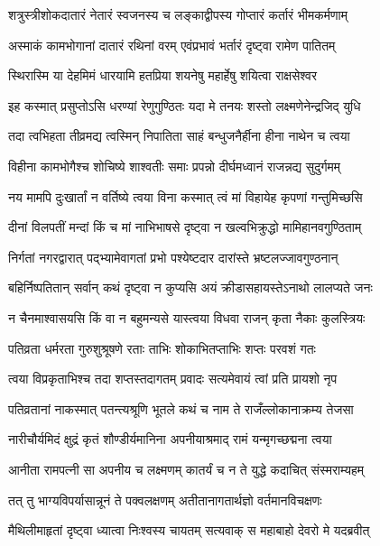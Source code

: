 \twolineshloka
{शत्रुस्त्रीशोकदातारं नेतारं स्वजनस्य च}
{लङ्काद्वीपस्य गोप्तारं कर्तारं भीमकर्मणाम्} %

\twolineshloka
{अस्माकं कामभोगानां दातारं रथिनां वरम्}
{एवंप्रभावं भर्तारं दृष्ट्वा रामेण पातितम्} %

\twolineshloka
{स्थिरास्मि या देहमिमं धारयामि हतप्रिया}
{शयनेषु महार्हेषु शयित्वा राक्षसेश्वर} %

\twolineshloka
{इह कस्मात् प्रसुप्तोऽसि धरण्यां रेणुगुण्ठितः}
{यदा मे तनयः शस्तो लक्ष्मणेनेन्द्रजिद् युधि} %

\twolineshloka
{तदा त्वभिहता तीव्रमद्य त्वस्मिन् निपातिता}
{साहं बन्धुजनैर्हीना हीना नाथेन च त्वया} %

\twolineshloka
{विहीना कामभोगैश्च शोचिष्ये शाश्वतीः समाः}
{प्रपन्नो दीर्घमध्वानं राजन्नद्य सुदुर्गमम्} %

\twolineshloka
{नय मामपि दुःखार्तां न वर्तिष्ये त्वया विना}
{कस्मात् त्वं मां विहायेह कृपणां गन्तुमिच्छसि} %

\twolineshloka
{दीनां विलपतीं मन्दां किं च मां नाभिभाषसे}
{दृष्ट्वा न खल्वभिक्रुद्धो मामिहानवगुण्ठिताम्} %

\twolineshloka
{निर्गतां नगरद्वारात् पद्भ्यामेवागतां प्रभो}
{पश्येष्टदार दारांस्ते भ्रष्टलज्जावगुण्ठनान्} %

\twolineshloka
{बहिर्निष्पतितान् सर्वान् कथं दृष्ट्वा न कुप्यसि}
{अयं क्रीडासहायस्तेऽनाथो लालप्यते जनः} %

\twolineshloka
{न चैनमाश्वासयसि किं वा न बहुमन्यसे}
{यास्त्वया विधवा राजन् कृता नैकाः कुलस्त्रियः} %

\twolineshloka
{पतिव्रता धर्मरता गुरुशुश्रूषणे रताः}
{ताभिः शोकाभितप्ताभिः शप्तः परवशं गतः} %

\twolineshloka
{त्वया विप्रकृताभिश्च तदा शप्तस्तदागतम्}
{प्रवादः सत्यमेवायं त्वां प्रति प्रायशो नृप} %

\twolineshloka
{पतिव्रतानां नाकस्मात् पतन्त्यश्रूणि भूतले}
{कथं च नाम ते राजँल्लोकानाक्रम्य तेजसा} %

\twolineshloka
{नारीचौर्यमिदं क्षुद्रं कृतं शौण्डीर्यमानिना}
{अपनीयाश्रमाद् रामं यन्मृगच्छद्मना त्वया} %

\twolineshloka
{आनीता रामपत्नी सा अपनीय च लक्ष्मणम्}
{कातर्यं च न ते युद्धे कदाचित् संस्मराम्यहम्} %

\twolineshloka
{तत् तु भाग्यविपर्यासान्नूनं ते पक्वलक्षणम्}
{अतीतानागतार्थज्ञो वर्तमानविचक्षणः} %

\twolineshloka
{मैथिलीमाहृतां दृष्ट्वा ध्यात्वा निःश्वस्य चायतम्}
{सत्यवाक् स महाबाहो देवरो मे यदब्रवीत्} %

